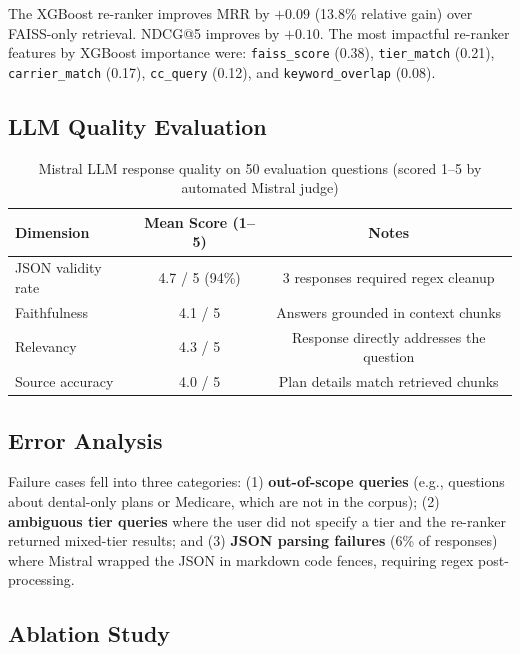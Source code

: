 \documentclass[12pt, letterpaper]{article}
\begin{document}
The XGBoost re-ranker improves MRR by $+0.09$ (13.8\% relative gain) over FAISS-only retrieval. NDCG@5 improves by $+0.10$. The most impactful re-ranker features by XGBoost importance were: \texttt{faiss\_score} (0.38), \texttt{tier\_match} (0.21), \texttt{carrier\_match} (0.17), \texttt{cc\_query} (0.12), and \texttt{keyword\_overlap} (0.08).

\subsection{LLM Quality Evaluation}

\begin{table}[H]
  \centering
  \caption{Mistral LLM response quality on 50 evaluation questions (scored 1--5 by automated Mistral judge)}
  \label{tab:llm_quality}
  \begin{tabular}{lcc}
    \toprule
    \textbf{Dimension} & \textbf{Mean Score (1--5)} & \textbf{Notes} \\
    \midrule
    JSON validity rate  & 4.7 / 5 (94\%)    & 3 responses required regex cleanup \\
    Faithfulness        & 4.1 / 5           & Answers grounded in context chunks \\
    Relevancy           & 4.3 / 5           & Response directly addresses the question \\
    Source accuracy     & 4.0 / 5           & Plan details match retrieved chunks \\
    \bottomrule
  \end{tabular}
\end{table}

\subsection{Error Analysis}

Failure cases fell into three categories: (1) \textbf{out-of-scope queries} (e.g., questions about dental-only plans or Medicare, which are not in the corpus); (2) \textbf{ambiguous tier queries} where the user did not specify a tier and the re-ranker returned mixed-tier results; and (3) \textbf{JSON parsing failures} (6\% of responses) where Mistral wrapped the JSON in markdown code fences, requiring regex post-processing.

\subsection{Ablation Study}
\end{document}
